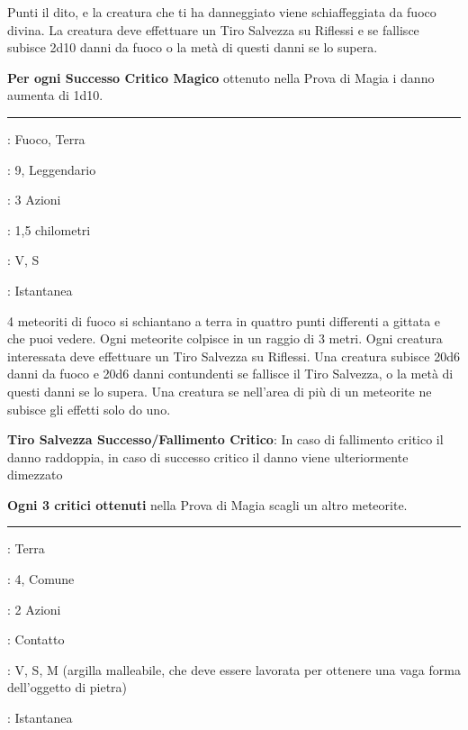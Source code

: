 \begin{multicols}{2}
Punti il dito, e la creatura che ti ha danneggiato viene schiaffeggiata da fuoco divina. La creatura deve effettuare un Tiro Salvezza su Riflessi e se fallisce subisce 2d10 danni da fuoco o la metà di questi danni se lo supera.

\textbf{Per ogni Successo Critico Magico} ottenuto nella Prova di Magia i danno aumenta di 1d10.

\smallskip\noindent\rule{\linewidth}{2pt} \hypertarget{Pioggia di Meteore}{}\medskip{}\hypertarget{sciamedimeteore}{}
\noindent
\begin{description}[noitemsep, topsep=0pt, parsep=0pt, partopsep=0pt, leftmargin=0cm, labelwidth=2.8cm]
	\item[\textbf{Lista di Magia}]: Fuoco, Terra
	\item[\textbf{Livello}]: 9, Leggendario
	\item[\textbf{T. di Lancio}]: 3 Azioni
	\item[\textbf{Gittata}]: 1,5 chilometri
	\item[\textbf{Componenti}]: V, S
	\item[\textbf{Durata}]: Istantanea
\end{description}

4 meteoriti di fuoco si schiantano a terra in quattro punti differenti a gittata e che puoi vedere. Ogni meteorite colpisce in un raggio di 3 metri. Ogni creatura interessata deve effettuare un Tiro Salvezza su Riflessi. Una creatura subisce 20d6 danni da fuoco e 20d6 danni contundenti se fallisce il Tiro Salvezza, o la metà di
questi danni se lo supera. Una creatura se nell'area di più di un meteorite ne subisce gli effetti solo do uno.

\textbf{Tiro Salvezza Successo/Fallimento Critico}: In caso di fallimento critico il danno raddoppia, in caso di successo critico il danno viene ulteriormente dimezzato

\textbf{Ogni 3 critici ottenuti} nella Prova di Magia scagli un altro meteorite.

\smallskip\noindent\rule{\linewidth}{2pt} \hypertarget{Scolpire Pietra}{}\medskip{}
\noindent
\begin{description}[noitemsep, topsep=0pt, parsep=0pt, partopsep=0pt, leftmargin=0cm, labelwidth=2.8cm]
	\item[\textbf{Lista di Magia}]: Terra
	\item[\textbf{Livello}]: 4, Comune
	\item[\textbf{T. di Lancio}]: 2 Azioni
	\item[\textbf{Gittata}]: Contatto
	\item[\textbf{Componenti}]: V, S, M (argilla malleabile, che deve essere lavorata per ottenere una vaga forma dell'oggetto di pietra)
	\item[\textbf{Durata}]: Istantanea
\end{description}


\end{multicols}
